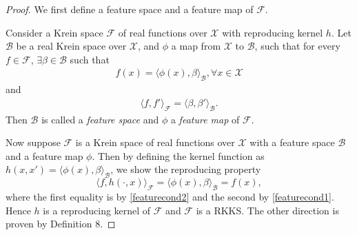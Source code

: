 \begin{proof}
	We first define a feature space and a feature map of $\mathcal F$.
	
	\begin{definition}[Features]
		Consider a Krein space $\mathcal F$ of real functions over $\mathcal X$ with reproducing kernel $h$.	Let $\mathcal B$ be a real Krein space over $\mathcal X$, and $\phi$ a map from $\mathcal X$ to $\mathcal B$, such that for every $f \in \mathcal F$, $\exists \beta \in \mathcal B$ such that 
		\begin{align}\label{featurecond1}
			f(x) = \langle \phi(x), \beta \rangle_{\mathcal B}, \forall x \in \mathcal X
		\end{align}
		and
		\begin{align}\label{featurecond2}
			\langle f, f' \rangle_{\mathcal F} = \langle \beta, \beta' \rangle_{\mathcal B}.
		\end{align}
	Then $\mathcal B$ is called a \textit{feature space} and $\phi$ a \textit{feature map} of $\mathcal F$. 
	\end{definition}
	
	Now suppose $\mathcal F$ is a Krein space of real functions over $\mathcal X$ with a feature space $\mathcal B$ and a feature map $\phi$. Then by defining the kernel function as $h(x, x') = \langle \phi(x), \beta \rangle_{\mathcal B}$, we show the reproducing property
	$$
	\langle f, h(\cdot,x) \rangle_{\mathcal F} = \langle \phi(x), \beta \rangle_{\mathcal B} = f(x),
	$$
	where the first equality is by \eqref{featurecond2} and the second by \eqref{featurecond1}. Hence $h$ is a reproducing kernel of $\mathcal F$ and $\mathcal F$ is a RKKS. The other direction is proven by Definition 8.
\end{proof}

